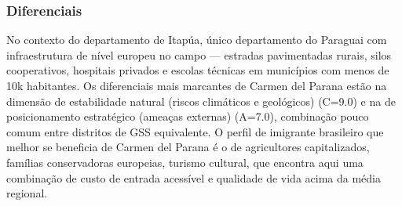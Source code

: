 \subsubsection*{Diferenciais}\label{dif-carmen-del-parana-0707}
No contexto do departamento de Itapúa, único departamento do Paraguai com infraestrutura de nível europeu no campo — estradas pavimentadas rurais, silos cooperativos, hospitais privados e escolas técnicas em municípios com menos de 10k habitantes. Os diferenciais mais marcantes de Carmen del Parana estão na dimensão de estabilidade natural (riscos climáticos e geológicos) (C=9.0) e na de posicionamento estratégico (ameaças externas) (A=7.0), combinação pouco comum entre distritos de GSS equivalente. O perfil de imigrante brasileiro que melhor se beneficia de Carmen del Parana é o de agricultores capitalizados, famílias conservadoras europeias, turismo cultural, que encontra aqui uma combinação de custo de entrada acessível e qualidade de vida acima da média regional.
